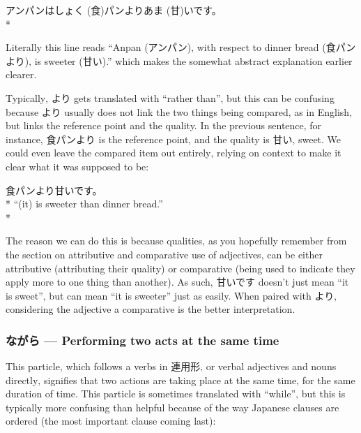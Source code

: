 \documentclass[11pt, b5paper, twoside, openright, onecolumn]{book}
\makeatletter
\newcommand*{\rubystack}[2]{{\relscale{0.5}%
  \begin{tabular}[b]{@{}c@{}}%
    {#1}\\%
   {\textscale{2}{#2}}%
  \end{tabular}}%
}
\DeclareRobustCommand*{\ruby}[2]{%
  \mbox{%
    \setlength{\parskip}{0ex}%
    \BeginAccSupp{method=pdfstringdef,ActualText={#1}}%
      \rubystack{\phantom{#2}}{#1}%
      \llap{%
        \rubystack{#2}{\phantom{#1}}%
      }%
    \EndAccSupp{}%
  }%
}
\renewcommand*{\ruby}[2]{#2 (#1)}%
\newenvironment{exampleblock}{
\setlength{\parindent}{0.6in}
\begin{minipage}[t]{\dimexpr\textwidth-\parindent}}
{\end{minipage}}
\makeatother
\begin{document}
\vspace{0.4cm}
\begin{exampleblock}
アンパンは\ruby{食}{しょく}パンより\ruby{甘}{あま}いです。 \\* 
\end{exampleblock}
\vspace{0.2cm}

Literally this line reads “Anpan (アンパン)‚ with respect to dinner bread (食パンより)‚ is sweeter (甘い).” which makes the somewhat abstract explanation earlier clearer. 

Typically‚ より gets translated with “rather than”‚ but this can be confusing because より usually does not link the two things being compared‚ as in English‚ but links the reference point and the quality. In the previous sentence‚ for instance‚ 食パンより is the reference point‚ and the quality is 甘い‚ sweet. We could even leave the compared item out entirely‚ relying on context to make it clear what it was supposed to be:

\vspace{0.4cm}
\begin{exampleblock}
食パンより甘いです。 \\* 
“(it) is sweeter than dinner bread.” \\* 
\end{exampleblock}
\vspace{0.2cm}

The reason we can do this is because qualities‚ as you hopefully remember from the section on attributive and comparative use of adjectives‚ can be either attributive (attributing their quality) or comparative (being used to indicate they apply more to one thing than another). As such‚ 甘いです doesn’t just mean “it is sweet”‚ but can mean “it is sweeter” just as easily. When paired with より‚ considering the adjective a comparative is the better interpretation.

\subsubsection{ながら — Performing two acts at the same time}

This particle‚ which follows a verbs in 連用形‚ or verbal adjectives and nouns directly‚ signifies that two actions are taking place at the same time‚ for the same duration of time. This particle is sometimes translated with “while”‚ but this is typically more confusing than helpful because of the way Japanese clauses are ordered (the most important clause coming last):
\end{document}
